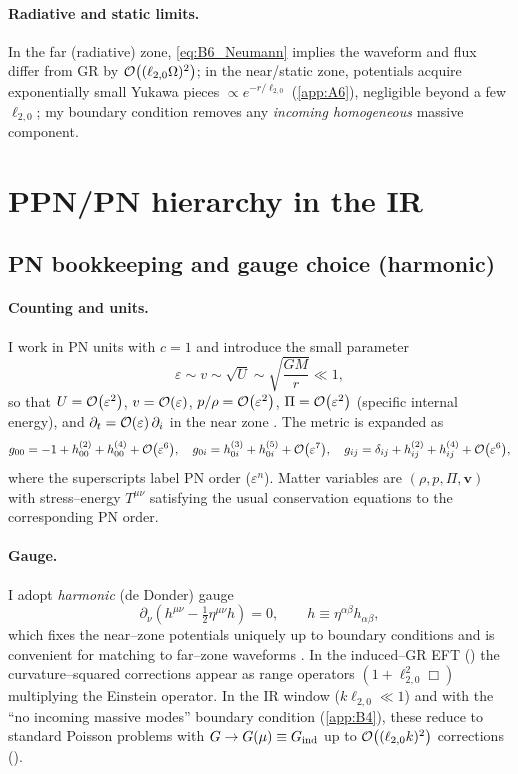 \documentclass{iopjournal}
\begin{document}
\paragraph{Radiative and static limits.}
In the far (radiative) zone, \eqref{eq:B6_Neumann} implies the waveform and flux differ from GR by $\order{(\ell_{2,0}\Omega)^2}$; in the near/static zone, potentials acquire exponentially small Yukawa pieces $\propto e^{-r/\ell_{2,0}}$ (\cref{app:A6}), negligible beyond a few $\ell_{2,0}$; my boundary condition removes any \emph{incoming homogeneous} massive component.


\section{PPN/PN hierarchy in the IR}\label{app:C} %

\subsection{PN bookkeeping and gauge choice (harmonic)}\label{app:C1}

\paragraph{Counting and units.}
I work in PN units with $c=1$ and introduce the small parameter
\[
\varepsilon\sim v\sim \sqrt{U}\sim \sqrt{\frac{GM}{r}}\ll1,
\]
so that $U=\order{\varepsilon^{2}}$, $v=\order{\varepsilon}$, $p/\rho=\order{\varepsilon^{2}}$, $\Pi=\order{\varepsilon^{2}}$ (specific internal energy), and $\partial_t=\order{\varepsilon}\,\partial_i$ in the near zone \cite{PoissonWill2014,Blanchet2014LRR}. The metric is expanded as
\[
g_{00}=-1+h_{00}^{(2)}+h_{00}^{(4)}+\order{\varepsilon^{6}},\quad
g_{0i}=h_{0i}^{(3)}+h_{0i}^{(5)}+\order{\varepsilon^{7}},\quad
g_{ij}=\delta_{ij}+h_{ij}^{(2)}+h_{ij}^{(4)}+\order{\varepsilon^{6}},
\]
where the superscripts label PN order ($\varepsilon^n$). Matter variables are $(\rho,p,\Pi,\boldsymbol v)$ with stress–energy $T^{\mu\nu}$ satisfying the usual conservation equations to the corresponding PN order.

\paragraph{Gauge.}
I adopt \emph{harmonic} (de Donder) gauge
\begin{equation}
\partial_\nu\!\left(h^{\mu\nu}-\tfrac12\eta^{\mu\nu}h\right)=0,
\qquad h\equiv \eta^{\alpha\beta}h_{\alpha\beta},
\label{eq:C1_harmonic}
\end{equation}
which fixes the near–zone potentials uniquely up to boundary conditions and is convenient for matching to far–zone waveforms \cite{PoissonWill2014,Blanchet2014LRR}. In the induced–GR EFT () the curvature–squared corrections appear as range operators $(1+\ell_{2,0}^2\Box)$ multiplying the Einstein operator. In the IR window ($k\ell_{2,0}\ll1$) and with the ``no incoming massive modes'' boundary condition (\cref{app:B4}), these reduce to standard Poisson problems with $G\to G(\mu)\equiv G_{\rm ind}$ up to $\order{(\ell_{2,0}k)^2}$ corrections ().
\end{document}
